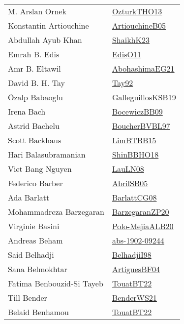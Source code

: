 {\begin{longtable}{p{4cm}p{20cm}}
M. Arslan Ornek & \href{articles/OzturkTHO13.pdf}{OzturkTHO13}\cite{OzturkTHO13} \\
Konstantin Artiouchine & \href{papers/ArtiouchineB05.pdf}{ArtiouchineB05}\cite{ArtiouchineB05} \\
Abdullah Ayub Khan & \href{}{ShaikhK23}\cite{ShaikhK23} \\
Emrah B. Edis & \href{papers/EdisO11.pdf}{EdisO11}\cite{EdisO11} \\
Amr B. Eltawil & \href{articles/AbohashimaEG21.pdf}{AbohashimaEG21}\cite{AbohashimaEG21} \\
David B. H. Tay & \href{}{Tay92}\cite{Tay92} \\
{\"{O}}zalp Babaoglu & \href{papers/GalleguillosKSB19.pdf}{GalleguillosKSB19}\cite{GalleguillosKSB19} \\
Irena Bach & \href{}{BocewiczBB09}\cite{BocewiczBB09} \\
Astrid Bachelu & \href{}{BoucherBVBL97}\cite{BoucherBVBL97} \\
Scott Backhaus & \href{papers/LimBTBB15.pdf}{LimBTBB15}\cite{LimBTBB15} \\
Hari Balasubramanian & \href{articles/ShinBBHO18.pdf}{ShinBBHO18}\cite{ShinBBHO18} \\
Viet Bang Nguyen & \href{papers/LauLN08.pdf}{LauLN08}\cite{LauLN08} \\
Federico Barber & \href{papers/AbrilSB05.pdf}{AbrilSB05}\cite{AbrilSB05} \\
Ada Barlatt & \href{papers/BarlattCG08.pdf}{BarlattCG08}\cite{BarlattCG08} \\
Mohammadreza Barzegaran & \href{papers/BarzegaranZP20.pdf}{BarzegaranZP20}\cite{BarzegaranZP20} \\
Virginie Basini & \href{}{Polo-MejiaALB20}\cite{Polo-MejiaALB20} \\
Andreas Beham & \href{articles/abs-1902-09244.pdf}{abs-1902-09244}\cite{abs-1902-09244} \\
Said Belhadji & \href{articles/BelhadjiI98.pdf}{BelhadjiI98}\cite{BelhadjiI98} \\
Sana Belmokhtar & \href{papers/ArtiguesBF04.pdf}{ArtiguesBF04}\cite{ArtiguesBF04} \\
Fatima Benbouzid{-}Si Tayeb & \href{papers/TouatBT22.pdf}{TouatBT22}\cite{TouatBT22} \\
Till Bender & \href{papers/BenderWS21.pdf}{BenderWS21}\cite{BenderWS21} \\
Belaid Benhamou & \href{papers/TouatBT22.pdf}{TouatBT22}\cite{TouatBT22} \\

\end{longtable}}
